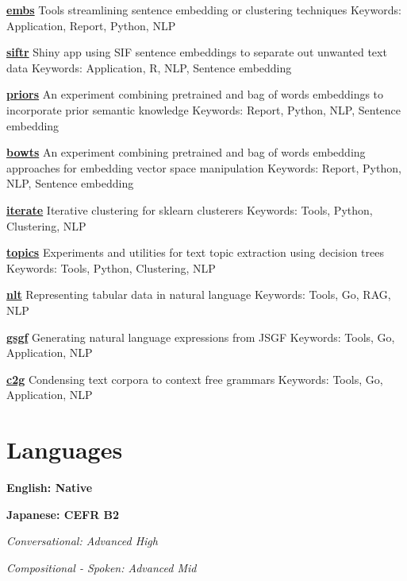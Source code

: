 \documentclass[a4paper,9pt]{extarticle}
\begin{document}
\noindent
\textbf{\href{https://github.com/ryancahildebrandt/embs}{embs}}
Tools streamlining sentence embedding or clustering techniques
Keywords: Application, Report, Python, NLP

\noindent
\textbf{\href{https://github.com/ryancahildebrandt/siftr}{siftr}}
Shiny app using SIF sentence embeddings to separate out unwanted text data
Keywords: Application, R, NLP, Sentence embedding

\noindent
\textbf{\href{https://github.com/ryancahildebrandt/priors}{priors}}
An experiment combining pretrained and bag of words embeddings to incorporate prior semantic knowledge
Keywords: Report, Python, NLP, Sentence embedding

\noindent
\textbf{\href{https://github.com/ryancahildebrandt/bowts}{bowts}}
An experiment combining pretrained and bag of words embedding approaches for embedding vector space manipulation
Keywords: Report, Python, NLP, Sentence embedding

\noindent
\textbf{\href{https://github.com/ryancahildebrandt/iterate}{iterate}}
Iterative clustering for sklearn clusterers
Keywords: Tools, Python, Clustering, NLP

\noindent
\textbf{\href{https://github.com/ryancahildebrandt/topics}{topics}}
Experiments and utilities for text topic extraction using decision trees
Keywords: Tools, Python, Clustering, NLP

\noindent
\textbf{\href{https://github.com/ryancahildebrandt/nlt}{nlt}}
Representing tabular data in natural language
Keywords: Tools, Go, RAG, NLP

\noindent
\textbf{\href{https://github.com/ryancahildebrandt/gsgf}{gsgf}}
Generating natural language expressions from JSGF
Keywords: Tools, Go, Application, NLP

\noindent
\textbf{\href{https://github.com/ryancahildebrandt/c2g}{c2g}}
Condensing text corpora to context free grammars
Keywords: Tools, Go, Application, NLP



\section*{Languages}

\noindent
\textbf{English: Native}

\noindent
\textbf{Japanese: CEFR B2}

\textit{Conversational: Advanced High}

\textit{Compositional - Spoken: Advanced Mid}
\end{document}
